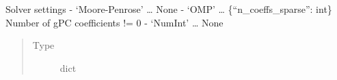 \documentclass[letterpaper,10pt,english,openany,oneside]{sphinxmanual}
\begin{document}
\begin{fulllineitems}

\begin{fulllineitems}
\label{\detokenize{pygpc:pygpc.SGPC.Reg.settings}}
Solver settings
- ‘Moore-Penrose’ … None
- ‘OMP’ … \{“n\_coeffs\_sparse”: int\} Number of gPC coefficients != 0
- ‘NumInt’ … None
\begin{quote}\begin{description}
\item[{Type}] \leavevmode
dict

\end{description}\end{quote}

\end{fulllineitems}


\end{fulllineitems}

\end{document}
